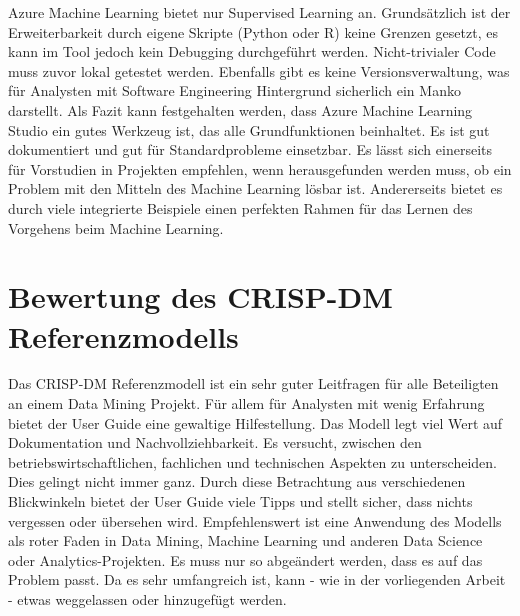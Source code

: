 Azure Machine Learning bietet nur Supervised Learning an.\newline
Grundsätzlich ist der Erweiterbarkeit durch eigene Skripte (Python oder R) keine Grenzen gesetzt, es kann im Tool jedoch kein Debugging durchgeführt werden. Nicht-trivialer Code muss zuvor lokal getestet werden. Ebenfalls gibt es keine Versionsverwaltung, was für Analysten mit Software Engineering Hintergrund sicherlich ein Manko darstellt.\newline
Als Fazit kann festgehalten werden, dass Azure Machine Learning Studio ein gutes Werkzeug ist, das alle Grundfunktionen beinhaltet. Es ist gut dokumentiert und gut für Standardprobleme einsetzbar. Es lässt sich einerseits für Vorstudien in Projekten empfehlen, wenn herausgefunden werden muss, ob ein Problem mit den Mitteln des Machine Learning lösbar ist. Andererseits bietet es durch viele integrierte Beispiele einen perfekten Rahmen für das Lernen des Vorgehens beim Machine Learning.

\section{Bewertung des CRISP-DM Referenzmodells}\label{sec:BeswertungCrisp}
Das CRISP-DM Referenzmodell ist ein sehr guter Leitfragen für alle Beteiligten an einem Data Mining Projekt. Für allem für Analysten mit wenig Erfahrung bietet der User Guide eine gewaltige Hilfestellung. Das Modell legt viel Wert auf Dokumentation und Nachvollziehbarkeit. Es versucht, zwischen den betriebswirtschaftlichen, fachlichen und technischen Aspekten zu unterscheiden. Dies gelingt nicht immer ganz. Durch diese Betrachtung aus verschiedenen Blickwinkeln bietet der User Guide viele Tipps und stellt sicher, dass nichts vergessen oder übersehen wird.\newline
Empfehlenswert ist eine Anwendung des Modells als roter Faden in Data Mining, Machine Learning und anderen Data Science oder Analytics-Projekten. Es muss nur so abgeändert werden, dass es auf das Problem passt. Da es sehr umfangreich ist, kann - wie in der vorliegenden Arbeit - etwas weggelassen oder hinzugefügt werden.


